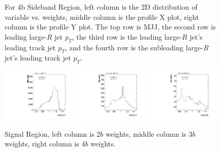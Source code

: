 \begin{figure}[htbp!]
\begin{center}
\caption{For 4b Sideband Region, left column is the 2D distribution of variable vs. weights, middle column is the profile X plot, right column is the profile Y plot. The top row is MJJ, the second row is leading large-$R$ jet $p_{T}$, the third row is the leading large-$R$ jet's leading track jet $p_{T}$, and the fourth row is the subleading large-$R$ jet's leading track jet $p_{T}$.}
\label{fig:app-reweight-dist-4b-SB}
\end{center}
\end{figure}


\begin{figure}[htbp!]
\begin{center}
\includegraphics[width=0.32\textwidth,angle=-90]{figures/boosted/AppendixReweight/Weights/2Trk_split_Signal_leadHCand_Pt_m_weight_projy.pdf}
\includegraphics[width=0.32\textwidth,angle=-90]{figures/boosted/AppendixReweight/Weights/3Trk_Signal_leadHCand_Pt_m_weight_projy.pdf}
\includegraphics[width=0.32\textwidth,angle=-90]{figures/boosted/AppendixReweight/Weights/4Trk_Signal_leadHCand_Pt_m_weight_projy.pdf}\\
\caption{Signal Region, left column is 2$b$ weights, middle column is 3$b$ weights, right column is 4$b$ weights.}
\label{fig:app-reweight-dist-weights-SR}
\end{center}
\end{figure}

